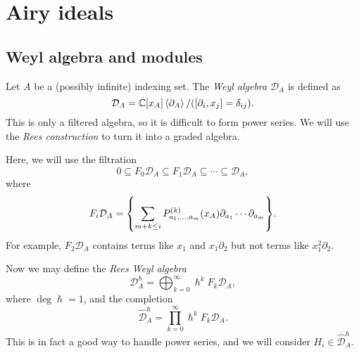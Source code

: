 \documentclass{amsart}
\theoremstyle{definition}
\theoremstyle{remark}
\theoremstyle{plain}
\theoremstyle{definition}
\theoremstyle{remark}
\newcommand{\C}{\mathbb{C}}
\newcommand{\mc}[1]{\mathcal{#1}}
\newcommand{\wh}[1]{\widehat{#1}}
\newcommand{\1}{\mathbf{1}}
\newcommand{\2}{\mathbf{2}}
\newcommand{\3}{\mathbf{3}}
\begin{document}
\section{Airy ideals}

\subsection{Weyl algebra and modules}

Let $A$ be a (possibly infinite) indexing set. The \textit{Weyl algebra} $\mc{D}_A$ is defined as 
\[ \mc{D}_A = \C[x_A] \ev{\partial_A} / ([\partial_i, x_j] = \delta_{ij}). \]
This is only a filtered algebra, so it is difficult to form power series. We will use the \textit{Rees construction} to turn it into a graded algebra.

Here, we will use the filtration
\[ \qty{0} \subseteq F_0 \mc{D}_A \subseteq F_1 \mc{D}_A \subseteq \cdots \subseteq \mc{D}_A, \]
where
\[ F_i \mc{D}_A = \qty{\sum_{m+k\leq i} P_{a_1, \ldots, a_m}^{(k)}(x_A) \partial_{a_1} \cdots \partial_{a_m}}. \]
For example, $F_2 \mc{D}_A$ contains terms like $x_1$ and $x_1 \partial_2$ but not terms like $x_1^2 \partial_2$.

Now we may define the \textit{Rees Weyl algebra}
\[ \mc{D}_A^{\hslash} = \bigoplus_{k=0}^{\infty} \hslash^k F_k \mc{D}_A, \]
where $\deg \hslash = 1$, and the completion
\[ \wh{\mc{D}}_A^{\hslash} = \prod_{k=0}^{\infty} \hslash^k F_k \mc{D}_A. \]
This is in fact a good way to handle power series, and we will consider $H_i \in \wh{\mc{D}}_A^{\hslash}$.
\end{document}
